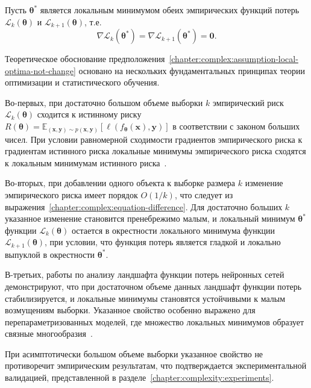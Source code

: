 \begin{assumption}\label{chapter:complex:assumption-local-optima-not-change}
    Пусть $\boldsymbol{\theta}^*$ является локальным минимумом обеих эмпирических функций потерь $\mathcal{L}_{k}(\boldsymbol{\theta})$ и $\mathcal{L}_{k+1}(\boldsymbol{\theta})$, т.е.
    \[
        \nabla \mathcal{L}_{k}(\boldsymbol{\theta}^*) = \nabla \mathcal{L}_{k+1}(\boldsymbol{\theta}^*) = \mathbf{0}.
    \]
\end{assumption}

Теоретическое обоснование предположения~\ref{chapter:complex:assumption-local-optima-not-change} основано на нескольких фундаментальных принципах теории оптимизации и статистического обучения.

Во-первых, при достаточно большом объеме выборки $k$ эмпирический риск $\mathcal{L}_{k}(\boldsymbol{\theta})$ сходится к истинному риску $R(\boldsymbol{\theta}) = \mathbb{E}_{(\mathbf{x},\mathbf{y}) \sim p(\mathbf{x},\mathbf{y})}[\ell(f_{\boldsymbol{\theta}}(\mathbf{x}), \mathbf{y})]$ в соответствии с законом больших чисел. При условии равномерной сходимости градиентов эмпирического риска к градиентам истинного риска локальные минимумы эмпирического риска сходятся к локальным минимумам истинного риска~\cite{vapnik1974StatTheory}.

Во-вторых, при добавлении одного объекта к выборке размера $k$ изменение эмпирического риска имеет порядок $O(1/k)$, что следует из выражения~\eqref{chapter:complex:equation-difference}. Для достаточно больших $k$ указанное изменение становится пренебрежимо малым, и локальный минимум $\boldsymbol{\theta}^*$ функции $\mathcal{L}_{k}(\boldsymbol{\theta})$ остается в окрестности локального минимума функции $\mathcal{L}_{k+1}(\boldsymbol{\theta})$, при условии, что функция потерь является гладкой и локально выпуклой в окрестности $\boldsymbol{\theta}^*$.

В-третьих, работы по анализу ландшафта функции потерь нейронных сетей~\cite{li2018visualizing,fort2019large} демонстрируют, что при достаточном объеме данных ландшафт функции потерь стабилизируется, и локальные минимумы становятся устойчивыми к малым возмущениям выборки. Указанное свойство особенно выражено для перепараметризованных моделей, где множество локальных минимумов образует связные многообразия~\cite{li2018visualizing}.

При асимптотически большом объеме выборки указанное свойство не противоречит эмпирическим результатам, что подтверждается экспериментальной валидацией, представленной в разделе~\ref{chapter:complexity:experiments}.


